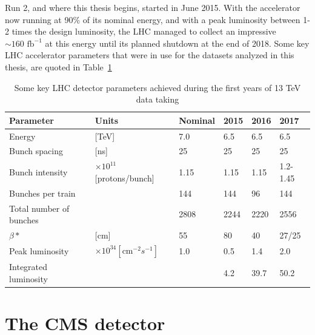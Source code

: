 Run 2, and where this thesis begins, started in June 2015. With the accelerator now running at 90\% of its nominal energy, and with a peak luminosity between 1-2 times the design luminosity, the LHC managed to collect an impressive $\sim 160 \textrm{ fb}^{-1}$ at this energy until its planned shutdown at the end of 2018. Some key LHC accelerator parameters that were in use for the datasets analyzed in this thesis, are quoted in Table~\ref{tab:LHCparameters}

\begin{table}[]
\begin{tabular}{| l | lllll |}
\hline
Parameter               & Units                                      & Nominal & 2015 & 2016 & 2017     \\
\hline
Energy                  & {[}TeV{]}                                  & 7.0     & 6.5  & 6.5  & 6.5      \\
Bunch spacing           & {[}ns{]}                                   & 25      & 25   & 25   & 25       \\
Bunch intensity         & $\times10^{11}${[}protons/bunch{]}         & 1.15    & 1.15 & 1.15 & 1.2-1.45 \\
Bunches per train       &                                            & 144     & 144  & 96   & 144      \\
Total number of bunches &                                            & 2808    & 2244 & 2220 & 2556     \\
$\beta*$                & {[}cm{]}                                   & 55      & 80   & 40   & 27/25    \\
Peak luminosity         & $\times 10^{34} [\textrm{cm}^{-2} s^{-1}]$ & 1.0     & 0.5  & 1.4  & 2.0      \\
Integrated luminosity   &                                            &         & 4.2  & 39.7 & 50.2     \\
\hline
\end{tabular}
\caption{Some key LHC detector parameters achieved during the first years of 13 TeV data taking}
\label{tab:LHCparameters}
\end{table}


\section{The CMS detector}


